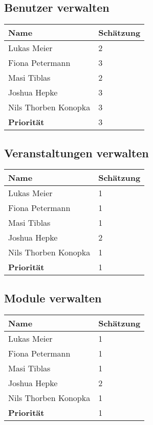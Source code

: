 \newpage

\subsection{Benutzer verwalten}
\begin{tabular} {|p{5cm}|p{}|}
	\hline
	Name & Schätzung \\
	\hline
	Lukas Meier 
	& 2 \\
	\hline
	Fiona Petermann 
	& 3 \\
	\hline
	Masi Tiblas 
	& 2 \\
	\hline
	Joshua Hepke
	& 3 \\
	\hline
	Nils Thorben Konopka
	& 3 \\
	\hline \hline
	\textbf{Priorität}
	& 3 \\
	\hline
\end{tabular}

\newpage

\subsection{Veranstaltungen verwalten}
\begin{tabular} {|p{5cm}|p{}|}
	\hline
	Name & Schätzung \\
	\hline
	Lukas Meier 
	& 1 \\
	\hline
	Fiona Petermann 
	& 1 \\
	\hline
	Masi Tiblas 
	& 1 \\
	\hline
	Joshua Hepke
	& 2 \\
	\hline
	Nils Thorben Konopka
	& 1 \\
	\hline \hline
	\textbf{Priorität}
	& 1 \\
	\hline
\end{tabular}

\newpage

\subsection{Module verwalten}
\begin{tabular} {|p{5cm}|p{}|}
	\hline
	Name & Schätzung \\
	\hline
	Lukas Meier 
	& 1 \\
	\hline
	Fiona Petermann 
	& 1 \\
	\hline
	Masi Tiblas 
	& 1 \\
	\hline
	Joshua Hepke
	& 2 \\
	\hline
	Nils Thorben Konopka
	& 1 \\
	\hline \hline
	\textbf{Priorität}
	& 1 \\
	\hline
\end{tabular}
